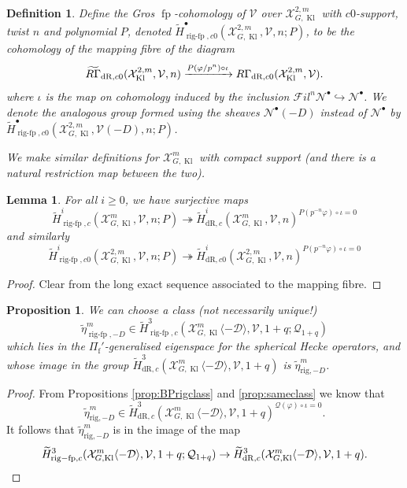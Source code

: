 \documentclass[cjm]{ipart}
\theoremstyle{plain}
\newtheorem{lemma}[theorem]{Lemma}
\newtheorem{proposition}[theorem]{Proposition}
\newtheorem{definition}[theorem]{Definition}
\theoremstyle{remark}
\DeclareMathOperator{\fp}{fp}
\DeclareMathOperator{\Kl}{Kl}
\DeclareMathOperator{\rigfp}{rig-fp}
\newcommand{\Pif}{\Pi_{\mathrm{f}}}
\newcommand{\RGt}{\widetilde{R\Gamma}}
\newcommand{\cD}{\mathcal{D}}
\newcommand{\cN}{\mathcal{N}}
\newcommand{\cQ}{\mathcal{Q}}
\newcommand{\cV}{\mathcal{V}}
\newcommand{\cX}{\mathcal{X}}
\newcommand{\dR}{\mathrm{dR}}
\newcommand{\into}{\hookrightarrow}
\newcommand{\rig}{\mathrm{rig}}
\newcommand{\sFil}{{\mathscr Fil}}
\newcommand{\wH}{\widetilde{H}}
\numberwithin{equation}{subsection}
\renewcommand{\geq}{\geqslant}
\begin{document}
\begin{definition}
 \label{def:grosfp2}
 Define the \emph{Gros $\fp$-cohomology of $\cV$ over $\cX_{G,\Kl}^{2,m}$} with $c0$-support, twist $n$ and polynomial $P$, denoted $\wH^\bullet_{\rigfp,c0}(\cX_{G,\Kl}^{2,m},\cV,n;P)$, to be the cohomology of the mapping fibre of the diagram
 \begin{equation}
  \label{eq:SGfp0}
  \RGt_{\dR, c0}(\cX_{\Kl}^{2,m}, \cV, n) \xrightarrow{\vspace{1ex}P(\varphi / p^n) \circ \iota\vspace{1ex}}  R\Gamma_{\dR, c0}(\cX_{\Kl}^{2,m},\cV).
 \end{equation}
 where $\iota$ is the map on cohomology induced by the inclusion $\sFil^{n}\cN^\bullet \into \cN^\bullet$. We denote the analogous group formed using the sheaves $\cN^\bullet(-D)$ instead of $\cN^\bullet$ by $\wH^\bullet_{\rigfp,c0}(\cX_{G,\Kl}^{2,m},\cV(-D),n;P)$.

 We make similar definitions for $\cX_{G,\Kl}^{m}$ with compact support (and there is a natural restriction map between the two).
\end{definition}

\begin{lemma}\label{lem:rigsurjontokerP}
 For all $i\geq 0$, we have surjective maps
  \[ \wH^i_{\rigfp,c}(\cX_{G,\Kl}^{m},\cV, n;P)\twoheadrightarrow \wH^i_{\dR,c}(\cX_{G,\Kl}^{m},\cV, n)^{P(p^{-n}\varphi) \circ \iota =0} \]
  and similarly
  \[ \wH^i_{\rigfp,c0}(\cX_{G,\Kl}^{2,m},\cV, n;P)\twoheadrightarrow \wH^i_{\dR,c0}(\cX_{G,\Kl}^{2,m},\cV, n)^{P(p^{-n}\varphi) \circ \iota =0} \]
\end{lemma}

\begin{proof}
 Clear from the long exact sequence associated to the mapping fibre.
\end{proof}


\begin{proposition}
 We can choose a class (not necessarily unique!)
 \[  \tilde{\eta}_{\rigfp,-D}^{m} \in \wH^3_{\rigfp, c}(\cX_{G,\Kl}^m\langle -\cD\rangle, \cV, 1+q; \cQ_{1+q}) \]
 which lies in the $\Pif'$-generalised eigenspace for the spherical Hecke operators, and whose image in the group $\wH^3_{\dR, c}(\cX_{G,\Kl}^m\langle -\cD\rangle, \cV, 1+q)$ is $\tilde{\eta}_{\rig,-D}^m$.
\end{proposition}

\begin{proof}
 From Propositions \ref{prop:BPrigclass} and \ref{prop:sameclass} we know that
 \[
 \tilde{\eta}_{\rig, -D}^m \in \wH^3_{\dR, c}(\cX_{G,\Kl}^m\langle -\cD\rangle, \cV, 1+q)^{\cQ(\varphi) \circ \iota = 0}.
 \]
 It follows that $\tilde{\eta}_{\rig,-D}^m$ is in the image of the map
 \[ \wH^3_{\rigfp, c}(\cX_{G,\Kl}^m\langle -\cD\rangle, \cV, 1+q; \cQ_{1+q}) \to \wH^3_{\dR, c}(\cX_{G,\Kl}^m\langle -\cD\rangle, \cV, 1+q).\qedhere\]
\end{proof}
\end{document}
